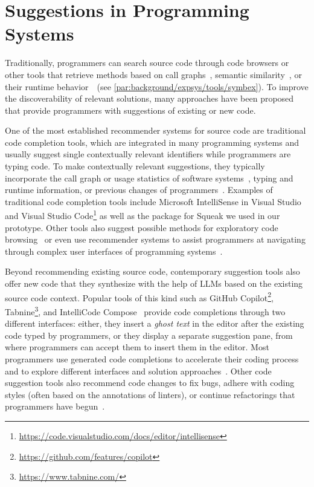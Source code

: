 
\section{Suggestions in Programming Systems}
\label{sec:related_work/suggestions}

Traditionally, programmers can search source code through code browsers or other tools that retrieve methods based on call graphs~\cites[chap.~10]{goldberg1984smalltalk}[sec.~6.2]{kraemer2010stacksplorer}{thiede2023squeak}, semantic similarity~\cite{husain2020codesearchnet}, or their runtime behavior~\cite[sec.~1.8]{thiede2023squeak}~(see \cref{par:background/expsys/tools/symbex}).
To improve the discoverability of relevant solutions, many approaches have been proposed that provide programmers with suggestions of existing or new code.

One of the most established recommender systems for source code are traditional code completion tools, which are integrated in many programming systems and usually suggest single contextually relevant identifiers while programmers are typing code.
To make contextually relevant suggestions, they typically incorporate the call graph or usage statistics of software systems~\cite{thiede2022augmenting}, typing and runtime information, or previous changes of programmers~\cite{robbes2008program}.
Examples of traditional code completion tools include Microsoft IntelliSense in Visual Studio and Visual Studio Code\footnote{\url{https://code.visualstudio.com/docs/editor/intellisense}} as well as the  package for Squeak we used in our prototype.
Other tools also suggest possible methods for exploratory code browsing~\cite{robillard2005automatic,bruch2006fruit} or even use recommender systems to assist programmers at navigating through complex user interfaces of programming systems~\cite{murphy2012improving}.

Beyond recommending existing source code, contemporary suggestion tools also offer new code that they synthesize with the help of LLMs based on the existing source code context.
Popular tools of this kind such as GitHub Copilot\footnote{\url{https://github.com/features/copilot}}, Tabnine\footnote{\url{https://www.tabnine.com/}}, and IntelliCode Compose~\cite{svyatkovskiy2020intellicode} provide code completions through two different interfaces:
either, they insert a \emph{ghost text} in the editor after the existing code typed by programmers, or they display a separate suggestion pane, from where programmers can accept them to insert them in the editor.
Most programmers use generated code completions to accelerate their coding process and to explore different interfaces and solution approaches~\cite{barka2023grounded}.
Other code suggestion tools also recommend code changes to fix bugs, adhere with coding styles (often based on the annotations of linters), or continue refactorings that programmers have begun~\cite{vaithilingam2023towards}.
